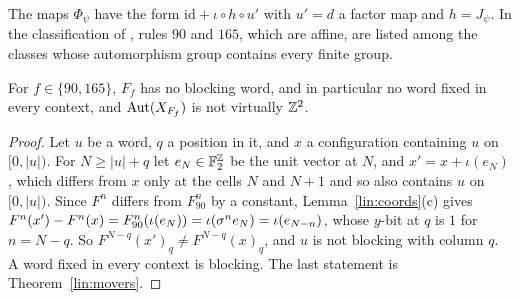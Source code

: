 The maps $\Phi_\psi$ have the form $\mathrm{id}+\iota\circ h\circ u'$ with $u'=d$ a factor map and $h=J_\psi$. In the classification of \cite{PaperD}, rules $90$ and $165$, which are affine, are listed among the classes whose automorphism group contains every finite group.

\begin{corollary}\label{lin:noblock}
For $f\in\{90,165\}$, $F_f$ has no blocking word, and in particular no word fixed in every context, and $\operatorname{Aut}(X_{F_f})$ is not virtually $\mathbb{Z}^2$.
\end{corollary}

\begin{proof}
Let $u$ be a word, $q$ a position in it, and $x$ a configuration containing $u$ on $[0,|u|)$. For $N\ge|u|+q$ let $e_N\in\mathbb{F}_2^{\mathbb{Z}}$ be the unit vector at $N$, and $x'=x+\iota(e_N)$, which differs from $x$ only at the cells $N$ and $N+1$ and so also contains $u$ on $[0,|u|)$. Since $F^n$ differs from $F_{90}^n$ by a constant, Lemma~\ref{lin:coords}(c) gives $F^n(x')-F^n(x)=F_{90}^n(\iota(e_N))=\iota(\sigma^ne_N)=\iota(e_{N-n})$, whose $y$-bit at $q$ is $1$ for $n=N-q$. So $F^{N-q}(x')_q\ne F^{N-q}(x)_q$, and $u$ is not blocking with column $q$. A word fixed in every context is blocking. The last statement is Theorem~\ref{lin:movers}.
\end{proof}

